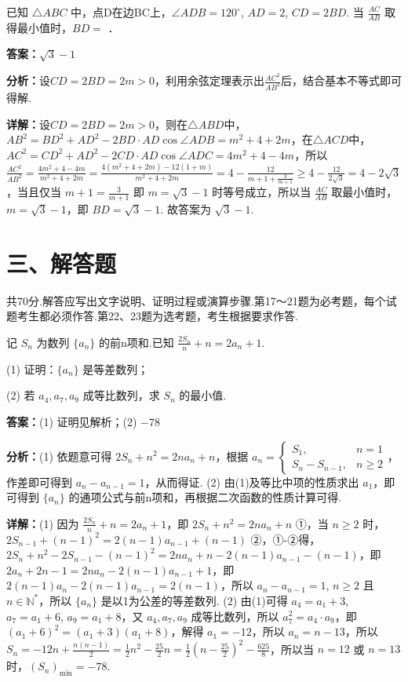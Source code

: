 \begin{question}[points=5]
已知 $\triangle ABC$ 中，点D在边BC上，$\angle ADB=120^\circ$, $AD=2$, $CD=2BD$. 当 $\frac{AC}{AB}$ 取得最小值时，$BD=$ ．
\fillin[{$\sqrt{3}-1$}]
\begin{solution}
\textbf{答案：}$\sqrt{3}-1$

\textbf{分析：}设$CD=2BD=2m>0$，利用余弦定理表示出$\frac{AC^2}{AB^2}$后，结合基本不等式即可得解.

\textbf{详解：}设$CD=2BD=2m>0$，则在$\triangle ABD$中，$AB^2=BD^2+AD^2-2BD\cdot AD\cos\angle ADB=m^2+4+2m$，在$\triangle ACD$中，$AC^2=CD^2+AD^2-2CD\cdot AD\cos\angle ADC=4m^2+4-4m$，所以 $\frac{AC^2}{AB^2}=\frac{4m^2+4-4m}{m^2+4+2m}=\frac{4(m^2+4+2m)-12(1+m)}{m^2+4+2m}=4-\frac{12}{m+1+\frac{3}{m+1}} \geq 4-\frac{12}{2\sqrt{3}}=4-2\sqrt{3}$，当且仅当 $m+1=\frac{3}{m+1}$ 即 $m=\sqrt{3}-1$ 时等号成立，所以当 $\frac{AC}{AB}$ 取最小值时，$m=\sqrt{3}-1$，即 $BD=\sqrt{3}-1$. 故答案为 $\sqrt{3}-1$.
\end{solution}
\end{question}

\section*{三、解答题}
共70分.解答应写出文字说明、证明过程或演算步骤.第17～21题为必考题，每个试题考生都必须作答.第22、23题为选考题，考生根据要求作答.

\begin{question}[points=12]
记 $S_n$ 为数列 $\{a_n\}$ 的前n项和.已知 $\frac{2S_n}{n}+n=2a_n+1$.

(1) 证明：$\{a_n\}$ 是等差数列；

(2) 若 $a_4, a_7, a_9$ 成等比数列，求 $S_n$ 的最小值.
\begin{solution}
\textbf{答案：}(1) 证明见解析；(2) $-78$

\textbf{分析：}(1) 依题意可得 $2S_n+n^2=2na_n+n$，根据 $a_n=\begin{cases} S_1, & n=1 \\ S_n-S_{n-1}, & n\ge 2 \end{cases}$，作差即可得到 $a_n-a_{n-1}=1$，从而得证. (2) 由(1)及等比中项的性质求出 $a_1$，即可得到 $\{a_n\}$ 的通项公式与前n项和，再根据二次函数的性质计算可得.

\textbf{详解：}(1) 因为 $\frac{2S_n}{n}+n=2a_n+1$，即 $2S_n+n^2=2na_n+n$ ①，当 $n\ge 2$ 时，$2S_{n-1}+(n-1)^2=2(n-1)a_{n-1}+(n-1)$ ②，①-②得，$2S_n+n^2-2S_{n-1}-(n-1)^2=2na_n+n-2(n-1)a_{n-1}-(n-1)$，即 $2a_n+2n-1=2na_n-2(n-1)a_{n-1}+1$，即 $2(n-1)a_n-2(n-1)a_{n-1}=2(n-1)$，所以 $a_n-a_{n-1}=1$, $n\ge 2$ 且 $n\in\mathbb{N}^*$，所以 $\{a_n\}$ 是以1为公差的等差数列.
(2) 由(1)可得 $a_4=a_1+3$, $a_7=a_1+6$, $a_9=a_1+8$，又 $a_4, a_7, a_9$ 成等比数列，所以 $a_7^2=a_4\cdot a_9$，即 $(a_1+6)^2=(a_1+3)(a_1+8)$，解得 $a_1=-12$，所以 $a_n=n-13$，所以 $S_n=-12n+\frac{n(n-1)}{2}=\frac{1}{2}n^2-\frac{25}{2}n=\frac{1}{2}\left(n-\frac{25}{2}\right)^2-\frac{625}{8}$，所以当 $n=12$ 或 $n=13$ 时，$(S_n)_{\min}=-78$.
\end{solution}
\end{question}

